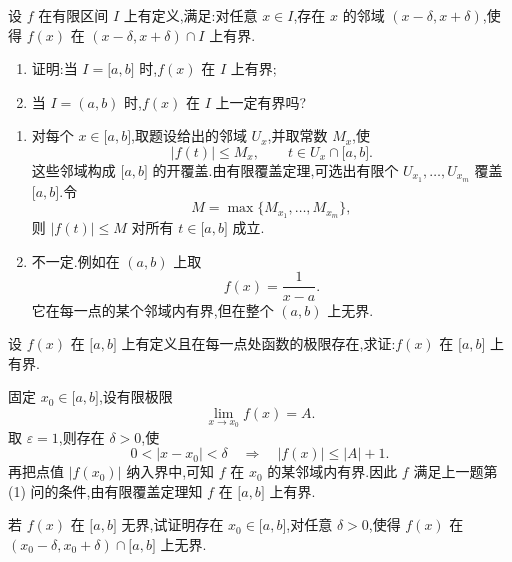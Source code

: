 \begin{example}
    设 $f$ 在有限区间 $I$ 上有定义,满足:对任意 $x\in I$,存在 $x$ 的邻域 $(x-\delta,x+\delta)$,使得 $f(x)$ 在 $(x-\delta,x+\delta)\cap I$ 上有界.
    \begin{enumerate}
        \item 证明:当 $I=\lbrack a,b\rbrack$ 时,$f(x)$ 在 $I$ 上有界;
        \item 当 $I=(a,b)$ 时,$f(x)$ 在 $I$ 上一定有界吗?
    \end{enumerate}
\end{example}
\exampleblank

\begin{solution}
    \leavevmode
    \begin{enumerate}
        \item 对每个 $x\in\lbrack a,b\rbrack$,取题设给出的邻域 $U_x$,并取常数 $M_x$,使
              \[
                  |f(t)|\leq M_x,
                  \qquad
                  t\in U_x\cap\lbrack a,b\rbrack.
              \]
              这些邻域构成 $\lbrack a,b\rbrack$ 的开覆盖.由有限覆盖定理,可选出有限个
              $U_{x_1},\ldots,U_{x_m}$ 覆盖 $\lbrack a,b\rbrack$.令
              \[
                  M=\max\{M_{x_1},\ldots,M_{x_m}\},
              \]
              则 $|f(t)|\leq M$ 对所有 $t\in\lbrack a,b\rbrack$ 成立.
        \item 不一定.例如在 $(a,b)$ 上取
              \[
                  f(x)=\dfrac{1}{x-a}.
              \]
              它在每一点的某个邻域内有界,但在整个 $(a,b)$ 上无界.
    \end{enumerate}
\end{solution}

\begin{example}
    设 $f(x)$ 在 $\lbrack a,b\rbrack$ 上有定义且在每一点处函数的极限存在,求证:$f(x)$ 在 $\lbrack a,b\rbrack$ 上有界.
\end{example}
\exampleblank

\begin{solution}
    固定 $x_0\in\lbrack a,b\rbrack$,设有限极限
    \[
        \displaystyle\lim\limits_{x\to x_0}f(x)=A.
    \]
    取 $\varepsilon=1$,则存在 $\delta>0$,使
    \[
        0<|x-x_0|<\delta
        \quad\Longrightarrow\quad
        |f(x)|\leq |A|+1.
    \]
    再把点值 $|f(x_0)|$ 纳入界中,可知 $f$ 在 $x_0$ 的某邻域内有界.因此 $f$ 满足上一题第 (1) 问的条件,由有限覆盖定理知 $f$ 在 $\lbrack a,b\rbrack$ 上有界.
\end{solution}

\begin{example}
    若 $f(x)$ 在 $\lbrack a,b\rbrack$ 无界,试证明存在 $x_0\in\lbrack a,b\rbrack$,对任意 $\delta>0$,使得 $f(x)$ 在 $(x_0-\delta,x_0+\delta)\cap\lbrack a,b\rbrack$ 上无界.
\end{example}
\exampleblank

